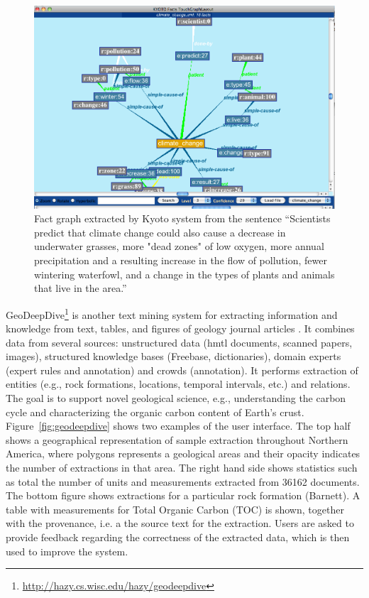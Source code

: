 \begin{figure}
\begin{center}
\includegraphics[scale=0.35]{figures/kyoto.png}
 \caption{Fact graph extracted by Kyoto system from the sentence ``Scientists predict that climate change could also cause a decrease in underwater grasses, more "dead zones" of low oxygen, more annual precipitation and a resulting increase in the flow of pollution, fewer wintering waterfowl, and a change in the types of plants and animals that live in the area.''}
\label{fig:kyoto}
\end{center}
\end{figure} 


GeoDeepDive\footnote{\url{http://hazy.cs.wisc.edu/hazy/geodeepdive}} is another text mining system for extracting information and knowledge from text, tables, and figures of geology journal articles \citep{Zhang2013GeoDeepDive}.
It combines data from several sources: unstructured data (hmtl documents, scanned papers, images), structured knowledge bases (Freebase, dictionaries), domain experts (expert rules and annotation) and crowds (annotation).
It performs extraction of entities (e.g., rock formations, locations, temporal intervals, etc.) and relations.
The goal is to support novel geological science, e.g., understanding the carbon cycle and characterizing the organic carbon content of Earth’s crust.
Figure~\ref{fig:geodeepdive} shows two examples of the user interface.
The top half shows a geographical representation of sample extraction throughout Northern America, where polygons represents a geological areas and their opacity indicates the number of extractions in that area.
The right hand side shows statistics such as total the number of units and measurements extracted from 36162 documents.
The bottom figure shows extractions for a particular rock formation (Barnett).
A table with measurements for Total Organic Carbon (TOC) is shown, together with the provenance, i.e. a the source text for the extraction.
Users are asked to provide feedback regarding the correctness of the extracted data, which is then used to improve the system.

